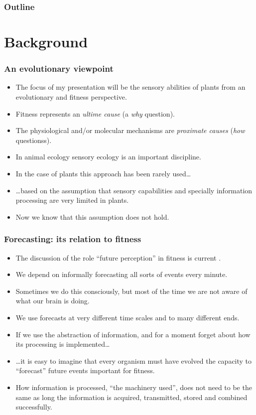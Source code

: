 \documentclass[10pt]{beamer}\usepackage[]{graphicx}\usepackage[]{color}
\begin{document}
	\begin{frame}
		\frametitle{Outline}
		\tableofcontents
	\end{frame}

\section{Background}

\begin{frame}[<+->]
  \frametitle{An evolutionary viewpoint}
  \begin{itemize}
    \item The focus of my presentation will be the sensory abilities of plants from an evolutionary and fitness perspective.
    \item Fitness represents an \emph{ultime cause} (a \emph{why} question).
    \item The physiological and/or molecular mechanisms are \emph{proximate causes} (\emph{how} questionss).
    \item In animal ecology sensory ecology is an important discipline.
    \item In the case of plants this approach has been rarely used\ldots
    \item \ldots based on the assumption that sensory capabilities and specially information processing are very limited in plants.
    \item Now we know that this assumption does not hold.
  \end{itemize}
\end{frame}

\begin{frame}[<+->]
  \frametitle{Forecasting: its relation to fitness}
  \begin{itemize}
    \item The discussion of the role ``future perception'' in fitness is current \autocite{Novoplansky2016a}.
    \item We depend on informally forecasting all sorts of events every minute.
    \item Sometimes we do this consciously, but most of the time we are not aware of what our brain is doing.
    \item We use forecasts at very different time scales and to many different ends.
    \item If we use the abstraction of information, and for a moment forget about how its processing is implemented\ldots
    \item \ldots it is easy to imagine that every organism must have evolved the capacity to ``forecast'' future events important for fitness.
    \item How information is processed, ``the machinery used'', does not need to be the same as long the information is acquired, transmitted, stored and combined successfully.
  \end{itemize}
\end{frame}
\end{document}
